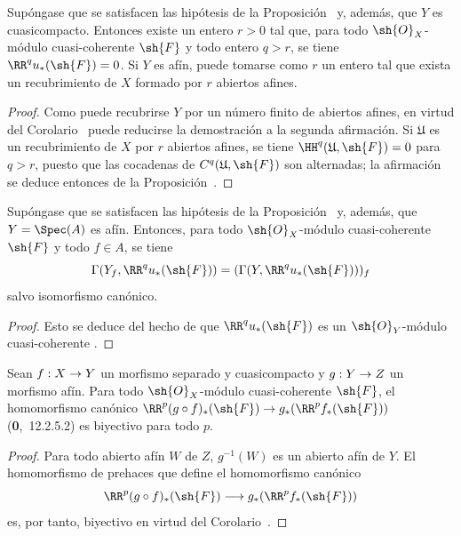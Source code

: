 \documentclass[oneside]{amsart}
\makeatletter
\newcommand{\ega@arrow}[2]{\mathchoice{#1}{#2}{#2}{#2}}
\renewcommand{\to}{\ega@arrow{\longrightarrow}{\rightarrow}}
\let\EGAOriginalLabel\label
\renewcommand{\label}[1]{\phantomsection\EGAOriginalLabel{#1}}
\makeatother
\begin{document}
\begin{corollary}[1.4.12]
\label{III.1.4.12}
Supóngase que se satisfacen las hipótesis de la Proposición~\textup{} y, además, que $Y$ es cuasicompacto.
Entonces existe un entero $r>0$ tal que, para todo $\sh{O}_X$-módulo cuasi-coherente $\sh{F}$ y todo entero $q>r$, se tiene $\RR^q u_*(\sh{F})=0$.
Si $Y$ es afín, puede tomarse como $r$ un entero tal que exista un recubrimiento de $X$ formado por $r$ abiertos afines.
\end{corollary}

\begin{proof}
Como puede recubrirse $Y$ por un número finito de abiertos afines, en virtud del Corolario~ puede reducirse la demostración a la segunda afirmación.
Si $\mathfrak{U}$ es un recubrimiento de $X$ por $r$ abiertos afines, se tiene $\HH^q(\mathfrak{U},\sh{F})=0$ para $q>r$, puesto que las cocadenas de $C^q(\mathfrak{U},\sh{F})$ son alternadas; la afirmación se deduce entonces de la Proposición~.
\end{proof}

\begin{corollary}[1.4.13]
\label{III.1.4.13}
Supóngase que se satisfacen las hipótesis de la Proposición~\textup{} y, además, que $Y=\Spec(A)$ es afín.
Entonces, para todo $\sh{O}_X$-módulo cuasi-coherente $\sh{F}$ y todo $f\in A$, se tiene
\[
  \Gamma(Y_f,\RR^q u_*(\sh{F}))=(\Gamma(Y,\RR^q u_*(\sh{F})))_f
\]
salvo isomorfismo canónico.
\end{corollary}

\begin{proof}
Esto se deduce del hecho de que $\RR^q u_*(\sh{F})$ es un $\sh{O}_Y$-módulo cuasi-coherente .
\end{proof}

\begin{proposition}[1.4.14]
\label{III.1.4.14}
Sean $f:X\to Y$ un morfismo separado y cuasicompacto y $g:Y\to Z$ un morfismo afín.
Para todo $\sh{O}_X$-módulo cuasi-coherente $\sh{F}$, el homomorfismo canónico $\RR^p(g\circ f)_*(\sh{F})\to g_*(\RR^p f_*(\sh{F}))$ \textup{(\textbf{0},~12.2.5.2)} es biyectivo para todo $p$.
\end{proposition}

\begin{proof}
Para todo abierto afín $W$ de $Z$, $g^{-1}(W)$ es un abierto afín de $Y$.
El homomorfismo de prehaces que define el homomorfismo canónico
\[
  \RR^p(g\circ f)_*(\sh{F})\to g_*(\RR^p f_*(\sh{F}))
\]
 es, por tanto, biyectivo en virtud del Corolario~.
\end{proof}
\end{document}
